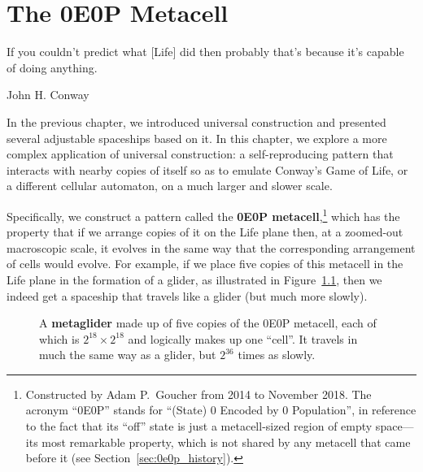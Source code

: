 
\renewcommand{\chapterfolder}{0e0p/}
\chapter{The 0E0P Metacell}\label{chp:0e0p}


\vspace*{-0.4in}
\epigraph{If you couldn't predict what [Life] did then probably that's because it's capable of doing anything.}{John H. Conway}
\vspace*{0.15in}


\noindent In the previous chapter, we introduced universal construction and presented several adjustable spaceships based on it. In this chapter, we explore a more complex application of universal construction: a self-reproducing pattern that interacts with nearby copies of itself so as to emulate Conway's Game of Life, or a different cellular automaton, on a much larger and slower scale.

Specifically, we construct a pattern called the \textbf{0E0P metacell},\footnote{Constructed by Adam P.~Goucher from 2014 to November 2018. The acronym ``0E0P'' stands for ``(State) 0 Encoded by 0 Population'', in reference to the fact that its ``off'' state is just a metacell-sized region of empty space---its most remarkable property, which is not shared by any metacell that came before it (see Section~\ref{sec:0e0p_history}).} which has the property that if we arrange copies of it on the Life plane then, at a zoomed-out macroscopic scale, it evolves in the same way that the corresponding arrangement of cells would evolve. For example, if we place five copies of this metacell in the Life plane in the formation of a glider, as illustrated in Figure~\ref{fig:0e0p_glider}, then we indeed get a spaceship that travels like a glider (but much more slowly).

\begin{figure}[!htb]
	\centering
	\caption{A \textbf{metaglider} made up of five copies of the 0E0P metacell, each of which is $2^{18} \times 2^{18}$ and logically makes up one ``cell''. It travels in much the same way as a glider, but $2^{36}$ times as slowly.}\label{fig:0e0p_glider}
\end{figure}

